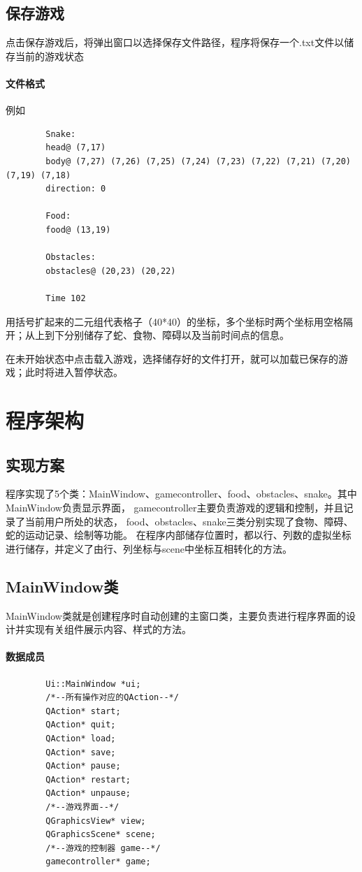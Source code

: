 \documentclass[utf-8]{ctexart}
\begin{document}
    \subsection{保存游戏}
    点击保存游戏后，将弹出窗口以选择保存文件路径，程序将保存一个.txt文件以储存当前的游戏状态
    \paragraph{文件格式}例如
    \begin{lstlisting}
        Snake:
        head@ (7,17)
        body@ (7,27) (7,26) (7,25) (7,24) (7,23) (7,22) (7,21) (7,20) (7,19) (7,18) 
        direction: 0

        Food:
        food@ (13,19)

        Obstacles:
        obstacles@ (20,23) (20,22) 

        Time 102
    \end{lstlisting}
    \par 用括号扩起来的二元组代表格子（40*40）的坐标，多个坐标时两个坐标用空格隔开；从上到下分别储存了蛇、食物、障碍以及当前时间点的信息。
    \par 在未开始状态中点击载入游戏，选择储存好的文件打开，就可以加载已保存的游戏；此时将进入暂停状态。

    \section{程序架构}
    \subsection{实现方案}
    程序实现了5个类：MainWindow、gamecontroller、food、obstacles、snake。其中MainWindow负责显示界面，
    gamecontroller主要负责游戏的逻辑和控制，并且记录了当前用户所处的状态，
    food、obstacles、snake三类分别实现了食物、障碍、蛇的运动记录、绘制等功能。
    在程序内部储存位置时，都以行、列数的虚拟坐标进行储存，并定义了由行、列坐标与scene中坐标互相转化的方法。
    \subsection{MainWindow类}
    MainWindow类就是创建程序时自动创建的主窗口类，主要负责进行程序界面的设计并实现有关组件展示内容、样式的方法。
    \paragraph{数据成员}
    \begin{lstlisting}
        Ui::MainWindow *ui;
        /*--所有操作对应的QAction--*/
        QAction* start;
        QAction* quit;
        QAction* load;
        QAction* save;
        QAction* pause;
        QAction* restart;
        QAction* unpause;
        /*--游戏界面--*/
        QGraphicsView* view;
        QGraphicsScene* scene;
        /*--游戏的控制器 game--*/
        gamecontroller* game;
    \end{lstlisting}
\end{document}

